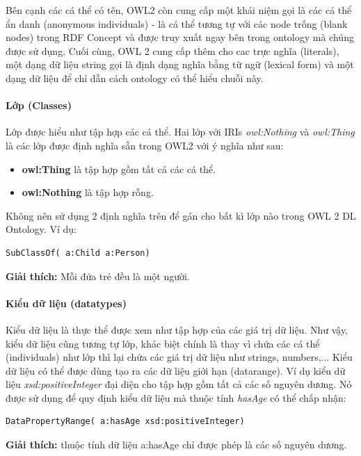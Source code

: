 Bên cạnh các cá thể có tên, OWL2 còn cung cấp một khái niệm gọi là các cá thể ẩn danh (anonymous individuals) - là cá thể tương tự với các node trống (blank nodes) trong RDF Concept \cite{rdf_concept} và được truy xuất ngay bên trong ontology mà chúng được sử dụng. Cuối cùng, OWL 2 cung cấp thêm cho cac trực nghĩa (literals), một dạng dữ liệu string gọi là định dạng nghĩa bằng từ ngữ (lexical form) và một dạng dữ liệu để chỉ dẫn cách ontology có thể hiểu chuỗi này.
\paragraph{Lớp (Classes)}
Lớp được hiểu như tập hợp các cá thể. Hai lớp với IRIs \textit{owl:Nothing} và \textit{owl:Thing} là các lớp được định nghĩa sẵn trong OWL2 với ý nghĩa như sau:
\begin{itemize}
	\item \textbf{owl:Thing} là tập hợp gồm tất cả các cá thể.
	\item \textbf{owl:Nothing} là tập hợp rỗng.
\end{itemize}
Không nên sử dụng 2 định nghĩa trên để gán cho bất kì lớp nào trong OWL 2 DL Ontology. 
Ví dụ:
\begin{verbatim}
SubClassOf( a:Child a:Person) 
\end{verbatim}
\textbf{Giải thích:} Mỗi đứa trẻ đều là một người.

\paragraph{Kiểu dữ liệu (datatypes)}
Kiểu dữ liệu là thực thể được xem như tập hợp của các giá trị dữ liệu. Như vậy, kiểu dữ liệu cũng tương tự lớp, khác biệt chính là thay vì chứa các cá thể (individuals) như lớp thì lại chứa các giá trị dữ liệu như strings, numbers,... Kiểu dữ liệu có thể được dùng tạo ra các dữ liệu giới hạn (datarange). Ví dụ kiểu dữ liệu \textit{xsd:positiveInteger} đại diện cho tập hợp gồm tất cả các số nguyên dương. Nó được sử dụng để quy định kiểu dữ liệu mà thuộc tính \textit{hasAge} có thể chấp nhận:

\begin{verbatim}
DataPropertyRange( a:hasAge xsd:positiveInteger) 
\end{verbatim}

\textbf{Giải thích:} thuộc tính dữ liệu a:hasAge chỉ được phép là các số nguyên dương.

